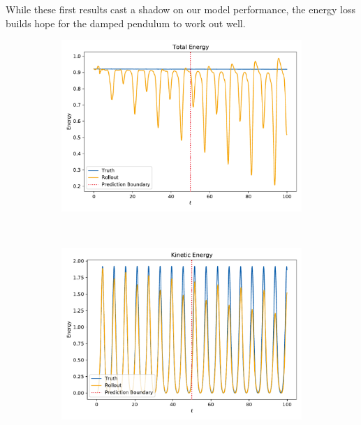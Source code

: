 		While these first results cast a shadow on our model performance, the energy loss builds hope for the damped pendulum to work out well.

		\begin{figure}
			\centering
			\begin{subfigure}{0.7\linewidth}
				\includegraphics[width=\linewidth]{figures/results/pendulum/run-latent-dim-10/energy-R10-N0-total.pdf}
			\end{subfigure} \\
			\begin{subfigure}{0.5\linewidth}
				\centering
				\includegraphics[width=\linewidth]{figures/results/pendulum/run-latent-dim-10/energy-R10-N0-kinetic.pdf}
			\end{subfigure}%
			~
			\begin{subfigure}{0.5\linewidth}

\end{subfigure}
\end{figure}
